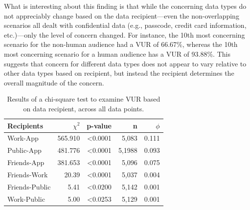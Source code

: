 \documentclass{acm_proc_article-sp}
\begin{document}
What is interesting about this finding is that while the concerning data types do not appreciably change based on the data recipient---even the non-overlapping scenarios all dealt with confidential data (e.g., passcode, credit card information, etc.)---only the level of concern changed. For instance, the 10th most concerning scenario for the non-human audience had a VUR of 66.67\%, whereas the 10th most concerning scenario for a human audience has a VUR of 93.88\%. This suggests that concern for different data types does not appear to vary relative to other data types based on recipient, but instead the recipient determines the overall magnitude of the concern.

\begin{table}[t]
\begin{center}
\begin{tabular}{|l|r|r|r|r|}
\hline
Recipients	& $\chi^2$ & p-value 	& n & $\phi$ \\
\hline
Work-App	& 565.910 & <0.0001 & 5,083 & 0.111\\
Public-App	& 481.776 & <0.0001 & 5,1988& 0.093\\
Friends-App & 381.653 & <0.0001 & 5,096 & 0.075\\
Friends-Work & 20.39 & <0.0001 & 5,037 & 0.004\\
Friends-Public & 5.41 & <0.0200 & 5,142 & 0.001\\
Work-Public&  5.00 & <0.0253 & 5,129	& 0.001\\
\hline
\end{tabular}
\caption{Results of a chi-square test to examine VUR based on data recipient, across all data points.}
\label{recipient}
\end{center}
\end{table}

\end{document}
